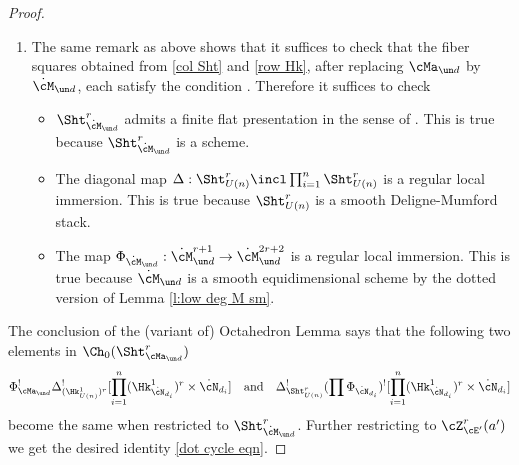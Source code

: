 \begin{proof}
\begin{enumerate}
\item The same remark as above shows that it suffices to check that the fiber squares obtained from \eqref{col Sht} and \eqref{row Hk}, after replacing $\cMa_{\un d}$ by $\dot\cM_{\un d}$,  each satisfy the condition \cite[A.2.8]{YZ}. Therefore it suffices to check
\begin{itemize}
\item $\Sht^{r}_{\dot\cM_{\un d}}$ admits a finite flat presentation in the sense of \cite[Definition A.1]{YZ}. This is true because $\Sht^{r}_{\dot\cM_{\un d}}$ is a scheme.
\item The diagonal map $\Delta: \Sht^{r}_{U(n)}\incl \prod_{i=1}^{n}\Sht^{r}_{U(n)}$ is a regular local immersion. This is true because $\Sht^{r}_{U(n)}$ is a smooth Deligne-Mumford stack.
\item The map $\Phi_{\dot\cM_{\un d}}: \dot\cM_{\un d}^{r+1}\to \dot\cM_{\un d}^{2r+2}$ is a regular local immersion. This is true because $\dot\cM_{\un d}$ is a smooth equidimensional scheme by the dotted version of Lemma \ref{l:low deg M sm}. %
\end{itemize}
\end{enumerate}
The conclusion of the (variant of) Octahedron Lemma says that the following two elements in $\Ch_{0}(\Sht^{r}_{\cMa_{\un d}})$
\begin{equation}
\Phi_{\cMa_{\un d}}^{!}\Delta_{(\Hk^{1}_{U(n)})^{r}}^{!}[\prod_{i=1}^{n}(\Hk^{1}_{\dot\cN_{d_{i}}})^{r} \times \dot\cN_{d_{i}}] \quad \mbox{and}\quad \Delta_{\Sht^{r}_{U(n)}}^{!}(\prod\Phi_{\dot\cN_{d_{i}}})^{!}[\prod_{i=1}^{n}(\Hk^{1}_{\dot\cN_{d_{i}}})^{r} \times \dot\cN_{d_{i}}]
\end{equation}
become the same when restricted to $\Sht^{r}_{\dot\cM_{\un d}}$. Further restricting to $\cZ_{\cE'}^r(a')$ we get the desired identity \eqref{dot cycle eqn}. %
\end{proof}



